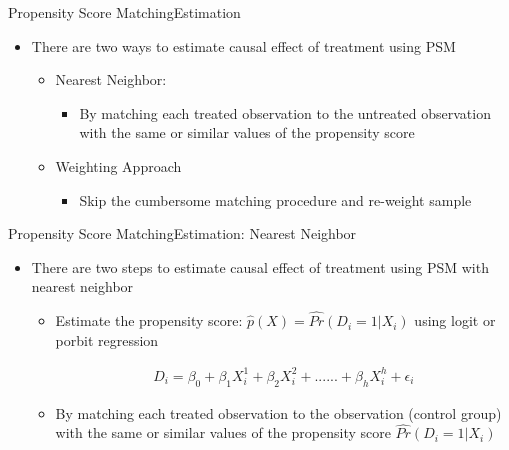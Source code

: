 \documentclass[dvipsnames,hyperref={pdfpagelabels=false}]{beamer}
\begin{document}
\begin{frame}{Propensity Score Matching}{Estimation}
	\begin{itemize}
		\item There are two ways to estimate causal effect of treatment using PSM
			\vspace{0.2cm}
			\begin{itemize}	
		\item[1] Nearest Neighbor: 
		
			\begin{itemize}
							\vspace{0.2cm}
		\item By matching each treated observation to the untreated observation with the same or similar values of the propensity score
					\end{itemize}
					\vspace{0.2cm}
		\item[2] Weighting Approach
		\begin{itemize}
			\vspace{0.2cm}
			\item Skip the cumbersome matching procedure and re-weight sample
		\end{itemize}
				
			\end{itemize}
	\end{itemize}
\end{frame}


\begin{frame}{Propensity Score Matching}{Estimation: Nearest Neighbor}
	\begin{itemize}
		\item There are two steps to estimate causal effect of treatment using PSM with nearest neighbor
		\vspace{0.2cm}
		\begin{itemize}
			\item[1] Estimate the propensity score: $\hat{p}(X)=\hat{Pr}(D_{i}=1|X_{i})$  using logit or porbit regression
			
	
		\begin{eqnarray*}
			D_{i} = \beta_{0}  + \beta_{1} X^{1}_{i}  + \beta_{2} X^{2}_{i}  + ...... + \beta_{h} X^{h}_{i}  + \epsilon_{i}
		\end{eqnarray*}	
			
			
			\item[2] By matching each treated observation
			to the observation (control group) with the same or similar values of the propensity score $\hat{Pr}(D_{i}=1|X_{i})$
		\end{itemize}
		
	\end{itemize}
\end{frame}
\end{document}
